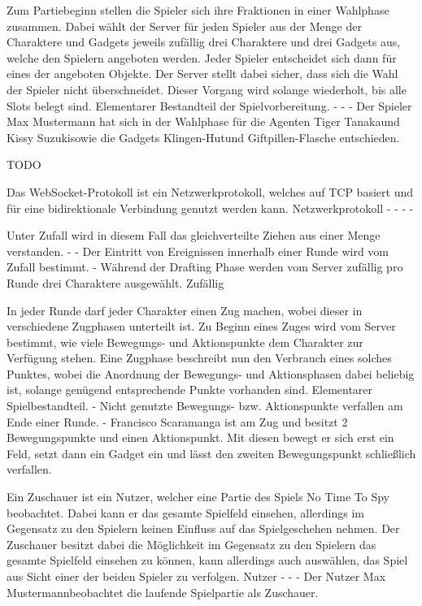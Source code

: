 {Zum Partiebeginn stellen die Spieler sich ihre Fraktionen in einer Wahlphase zusammen. Dabei wählt der Server für jeden Spieler aus der Menge der Charaktere und Gadgets jeweils zufällig drei Charaktere und drei Gadgets aus, welche den Spielern angeboten werden. Jeder Spieler entscheidet sich dann für eines der angeboten Objekte. Der Server stellt dabei sicher, dass sich die Wahl der Spieler nicht überschneidet. Dieser Vorgang wird solange wiederholt, bis alle Slots belegt sind.}
{Elementarer Bestandteil der Spielvorbereitung.}
{-}
{-}
{-}
{Der Spieler \glqq Max Mustermann \grqq hat sich in der Wahlphase für die Agenten \glqq Tiger Tanaka\grqq und \glqq Kissy Suzuki\grqq sowie die Gadgets \glqq Klingen-Hut\grqq und \glqq Giftpillen-Flasche \grqq entschieden.}

{TODO}

{Das WebSocket-Protokoll ist ein Netzwerkprotokoll, welches auf TCP basiert und für eine bidirektionale Verbindung genutzt werden kann.}
{Netzwerkprotokoll}
{-}
{-}
{-}
{-}

{Unter Zufall wird in diesem Fall das gleichverteilte Ziehen aus einer Menge verstanden.}
{-}
{-}
{Der Eintritt von Ereignissen innerhalb einer Runde wird vom Zufall bestimmt.}
{-}
{Während der Drafting Phase werden vom Server zufällig pro Runde drei Charaktere ausgewählt.}
{Zufällig}

{In jeder Runde darf jeder Charakter einen Zug machen, wobei dieser in verschiedene Zugphasen unterteilt ist. Zu Beginn eines Zuges wird vom Server bestimmt, wie viele Bewegungs- und Aktionspunkte dem Charakter zur Verfügung stehen. Eine Zugphase beschreibt nun den Verbrauch eines solches Punktes, wobei die Anordnung der Bewegungs- und Aktionsphasen dabei beliebig ist, solange genügend entsprechende Punkte vorhanden sind.}
{Elementarer Spielbestandteil.}
{-}
{Nicht genutzte Bewegungs- bzw. Aktionspunkte verfallen am Ende einer Runde.}
{-}
{Francisco Scaramanga ist am Zug und besitzt 2 Bewegungspunkte und einen Aktionspunkt. Mit diesen bewegt er sich erst ein Feld, setzt dann ein Gadget ein und lässt den zweiten Bewegungspunkt schließlich verfallen.}

{Ein Zuschauer ist ein Nutzer, welcher eine Partie des Spiels \glqq{}No Time To Spy\grqq{} beobachtet. Dabei kann er das gesamte Spielfeld einsehen, allerdings im Gegensatz zu den Spielern keinen Einfluss auf das Spielgeschehen nehmen. Der Zuschauer besitzt dabei die Möglichkeit im Gegensatz zu den Spielern das gesamte Spielfeld einsehen zu können, kann allerdings auch auswählen, das Spiel aus Sicht einer der beiden Spieler zu verfolgen.}
{Nutzer}
{-}
{-}
{-}
{Der Nutzer \glqq Max Mustermann\grqq beobachtet die laufende Spielpartie als Zuschauer.}

